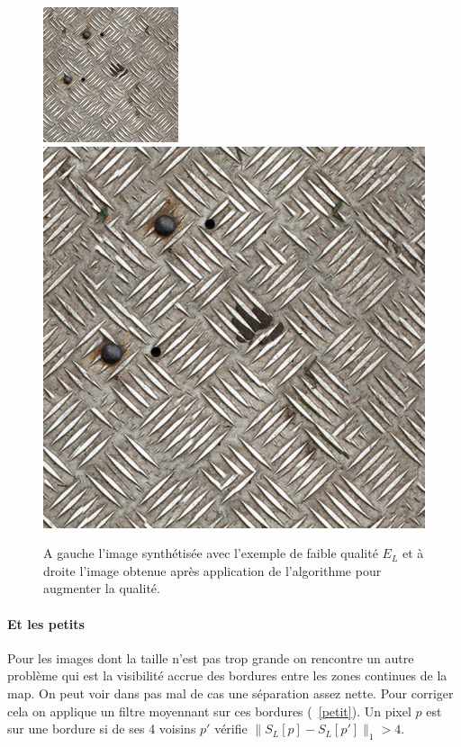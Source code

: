 \documentclass[12pt]{article}
\begin{document}
\begin{figure}[h]
	\centering
	\includegraphics[scale=3.2]{downsized.png} \qquad \quad
	\includegraphics[scale=0.8]{magnific.png}
	\captionsetup{justification=centering}
	\caption{A gauche l'image synthétisée avec l'exemple de faible qualité $E_L$ et à droite l'image obtenue après application de l'algorithme pour augmenter la qualité.}
	\label{magn_res}
\end{figure}

\paragraph{Et les petits}
Pour les images dont la taille n'est pas trop grande on rencontre un autre problème qui est la visibilité accrue des bordures entre les zones continues de la map. On peut voir dans pas mal de cas une séparation assez nette. Pour corriger cela on applique un filtre moyennant sur ces bordures (\figurename~\ref{petit}). Un pixel $p$ est sur une bordure si de ses 4 voisins $p'$ vérifie $\| S_L[p] - S_L[p'] \|_1 > 4$.
\end{document}

